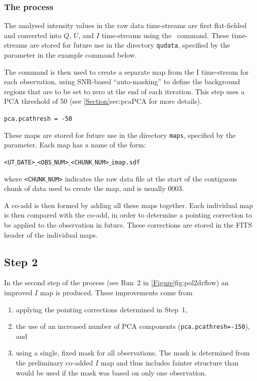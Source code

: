 \subsubsection*{The process}
The analysed intensity values in the raw data time-streams are first
flat-fielded and converted into $Q$, $U$, and $I$ time-streams using the
\calcqu\ command. These time-streams
are stored for future use in the directory \texttt{qudata}, specified by the
 parameter in the example command below.

The  command is then used to
create a separate map from the I time-stream for each observation,
using SNR-based ``auto-masking'' to define the background regions that
are to be set to zero at the end of each iteration. This step uses a
PCA threshold of 50 (see \cref{Section}{sec:pca}{PCA} for more details).

\texttt{pca.pcathresh = -50}

These maps are stored for future use in the directory \texttt{maps},
specified by the  parameter. Each map has a name of the form:

\texttt{<UT$\_$DATE>$\_$<OBS$\_$NUM>$\_$<CHUNK$\_$NUM>$\_$imap.sdf}

where \texttt{<CHUNK$\_$NUM>} indicates the raw data file at the start
of the contiguous chunk of data used to create the map, and is usually
0003.

A co-add is then formed by adding all these maps together. Each individual map
is then compared with the co-add, in order to determine a pointing correction
to be applied to the observation in future. These corrections are stored
in the FITS header of the individual maps.


\subsection*{Step 2}

In the second step of the process (see Run~2 in
\cref{Figure}{fig:pol2drflow}{}) an improved $I$ map is produced. These
improvements come from
\begin{enumerate}
\item applying the pointing corrections determined in Step~1,
\item the use of an increased number of PCA components
  (\texttt{pca.pcathresh=-150}), and
\item using a single, fixed mask for all observations. The mask is
  determined from the preliminary co-added $I$ map and thus includes
  fainter structure than would be used if the mask was based on only
  one observation.
\end{enumerate}


